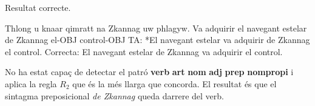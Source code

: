 \begin{enumerate}
     Resultat correcte.


     \begin{example}
     \gll Thlong u knaar qimratt na Zkannag uw phlagyw.
          {Va adquirir} el navegant estelar de Zkannag el-OBJ control-OBJ
     \glt TA: *El navegant estelar va adquirir de Zkannag el control.
     \glt Correcta: El navegant estelar de Zkannag va adquirir el control.
     \glend
     \end{example}

     No ha estat capaç de detectar el patró \textbf{verb} \textbf{art}
     \textbf{nom} \textbf{adj} \textbf{prep}
     \textbf{nompropi} i aplica la regla $R_2$ que és la més llarga
     que concorda. El resultat és que el sintagma preposicional
     \emph{de Zkannag} queda darrere del verb.



  
  



\end{enumerate}
